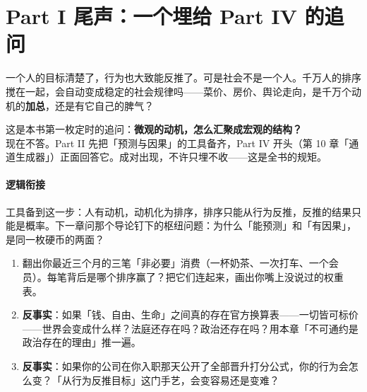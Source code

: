 \documentclass[../../main2.tex]{subfiles}
\begin{document}
\section{Part I 尾声：一个埋给 Part IV 的追问}

一个人的目标清楚了，行为也大致能反推了。可是社会不是一个人。千万人的排序搅在一起，会自动变成稳定的社会规律吗——菜价、房价、舆论走向，是千万个动机的\textbf{加总}，还是有它自己的脾气？

\begin{warningbox}
	这是本书第一枚定时的追问：\textbf{微观的动机，怎么汇聚成宏观的结构？}\\
	现在不答。Part II 先把「预测与因果」的工具备齐，Part IV 开头（第 10 章「通道生成器」）正面回答它。成对出现，不许只埋不收——这是全书的规矩。
\end{warningbox}

\paragraph*{逻辑衔接}
	工具备到这一步：人有动机，动机化为排序，排序只能从行为反推，反推的结果只能是概率。下一章问那个导论钉下的枢纽问题：为什么「能预测」和「有因果」，是同一枚硬币的两面？

\begin{thinkbox}
\begin{enumerate}
	\item 翻出你最近三个月的三笔「非必要」消费（一杯奶茶、一次打车、一个会员）。每笔背后是哪个排序赢了？把它们连起来，画出你嘴上没说过的权重表。
	\item \textbf{反事实}：如果「钱、自由、生命」之间真的存在官方换算表——一切皆可标价——世界会变成什么样？法庭还存在吗？政治还存在吗？用本章「不可通约是政治存在的理由」推一遍。
	\item \textbf{反事实}：如果你的公司在你入职那天公开了全部晋升打分公式，你的行为会怎么变？「从行为反推目标」这门手艺，会变容易还是变难？
\end{enumerate}
\end{thinkbox}
\end{document}
